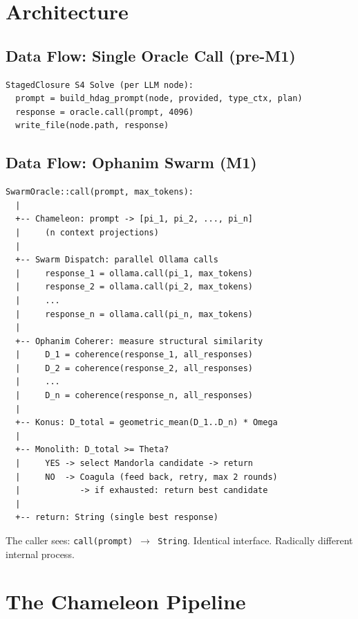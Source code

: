\documentclass[11pt,a4paper]{article}
\begin{document}
\section{Architecture}

\subsection{Data Flow: Single Oracle Call (pre-M1)}

\begin{lstlisting}[style=bash]
StagedClosure S4 Solve (per LLM node):
  prompt = build_hdag_prompt(node, provided, type_ctx, plan)
  response = oracle.call(prompt, 4096)
  write_file(node.path, response)
\end{lstlisting}

\subsection{Data Flow: Ophanim Swarm (M1)}

\begin{lstlisting}[style=bash]
SwarmOracle::call(prompt, max_tokens):
  |
  +-- Chameleon: prompt -> [pi_1, pi_2, ..., pi_n]
  |     (n context projections)
  |
  +-- Swarm Dispatch: parallel Ollama calls
  |     response_1 = ollama.call(pi_1, max_tokens)
  |     response_2 = ollama.call(pi_2, max_tokens)
  |     ...
  |     response_n = ollama.call(pi_n, max_tokens)
  |
  +-- Ophanim Coherer: measure structural similarity
  |     D_1 = coherence(response_1, all_responses)
  |     D_2 = coherence(response_2, all_responses)
  |     ...
  |     D_n = coherence(response_n, all_responses)
  |
  +-- Konus: D_total = geometric_mean(D_1..D_n) * Omega
  |
  +-- Monolith: D_total >= Theta?
  |     YES -> select Mandorla candidate -> return
  |     NO  -> Coagula (feed back, retry, max 2 rounds)
  |            -> if exhausted: return best candidate
  |
  +-- return: String (single best response)
\end{lstlisting}

The caller sees: \texttt{call(prompt) $\to$ String}. Identical 
interface. Radically different internal process.


\section{The Chameleon Pipeline}
\label{sec:chameleon}
\end{document}
